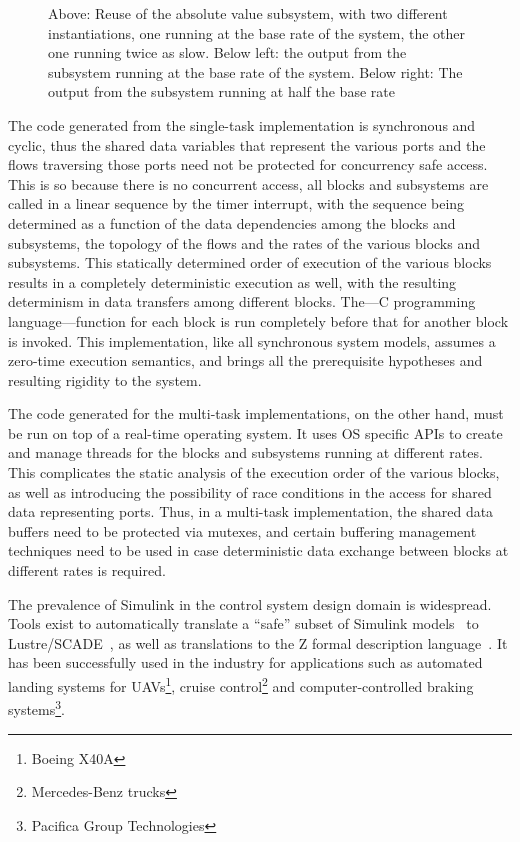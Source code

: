 \begin{figure}
\caption{Above: Reuse of the absolute value subsystem, with two
  different instantiations, one running at the base rate of the
  system, the other one running twice as slow. Below left: the output
  from the subsystem running at the base rate of the system. Below
  right: The output from the subsystem running at half the base rate}
\label{fig:abs_output_graphs}
\end{figure}

The code generated from the single-task implementation is synchronous
and cyclic, thus the shared data variables that represent the various
ports and the flows traversing those ports need not be protected for
concurrency safe access. This is so because there is no concurrent
access, all blocks and subsystems are called in a linear sequence by
the timer interrupt, with the sequence being determined as a function
of the data dependencies among the blocks and subsystems, the topology
of the flows and the rates of the various blocks and subsystems. This
statically determined order of execution of the various blocks results
in a completely deterministic execution as well, with the resulting
determinism in data transfers among different blocks. The---C
programming language---function for each block is run completely
before that for another block is invoked. This implementation, like
all synchronous system models, assumes a zero-time execution
semantics, and brings all the prerequisite hypotheses and resulting
rigidity to the system.

The code generated for the multi-task implementations, on the other
hand, must be run on top of a real-time operating system. It uses OS
specific APIs to create and manage threads for the blocks and
subsystems running at different rates. This complicates the static
analysis of the execution order of the various blocks, as well as
introducing the possibility of race conditions in the access for
shared data representing ports. Thus, in a multi-task implementation,
the shared data buffers need to be protected via mutexes, and certain
buffering management techniques need to be used in case deterministic
data exchange between blocks at different rates is required.

The prevalence of Simulink in the control system design domain is
widespread. Tools exist to automatically translate a ``safe'' subset
of Simulink models~\cite{caspi@emsoft04} to
Lustre/SCADE~\cite{caspi@sigplan03}, as well as translations to the Z
formal description language~\cite{arthan@icfem00}. It has been
successfully used in the industry for applications such as automated
landing systems for UAVs\footnote{Boeing X40A}, cruise
control\footnote{Mercedes-Benz trucks} and computer-controlled braking
systems\footnote{Pacifica Group Technologies}.

